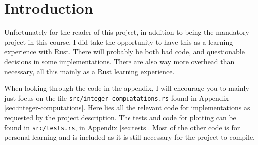 \section{Introduction}

Unfortunately for the reader of this project, in addition to being the mandatory project in this course, I did take the opportunity to have this as a learning experience with Rust. There will probably be both bad code, and questionable decisions in some implementations. There are also way more overhead than necessary, all this mainly as a Rust learning experience.

When looking through the code in the appendix, I will encourage you to mainly just focus on the file \lstinline{src/integer_compuatations.rs} found in Appendix \ref{sec:integer-computations}.
Here lies all the relevant code for implementations as requested by the project description.
The tests and code for plotting can be found in \lstinline{src/tests.rs}, in Appendix \ref{sec:tests}.
Most of the other code is for personal learning and is included as it is still necessary for the project to compile.

